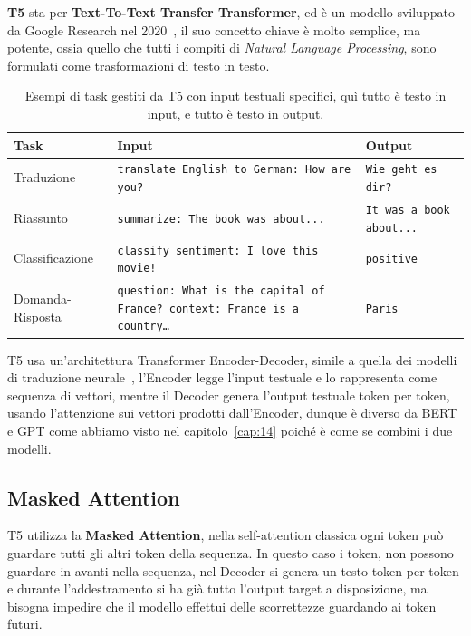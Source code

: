 \textbf{T5} sta per \textbf{Text-To-Text Transfer Transformer}, ed è un modello sviluppato da Google Research nel 2020~\cite{raffel2020t5}, il suo concetto chiave è molto semplice, ma potente, ossia quello che tutti i compiti di \textit{Natural Language Processing}, sono formulati come trasformazioni di testo in testo.

\begin{table}[htbp]
\centering
\begin{adjustbox}{width=0.9\textwidth}
\begin{tabular}{|l|p{7cm}|l|}
\hline
\textbf{Task} & \textbf{Input} & \textbf{Output} \\
\hline
Traduzione & \texttt{translate English to German: How are you?} & \texttt{Wie geht es dir?} \\
\hline
Riassunto & \texttt{summarize: The book was about...} & \texttt{It was a book about...} \\
\hline
Classificazione & \texttt{classify sentiment: I love this movie!} & \texttt{positive} \\
\hline
Domanda-Risposta & \texttt{question: What is the capital of France? context: France is a country\dots} & \texttt{Paris} \\
\hline
\end{tabular}
\end{adjustbox}
\caption{Esempi di task gestiti da T5 con input testuali specifici, quì tutto è testo in input, e tutto è testo in output.}
\end{table}
T5 usa un'architettura Transformer Encoder-Decoder, simile a quella dei modelli di traduzione neurale~\cite{vaswani2017attention}, l'Encoder legge l'input testuale e lo rappresenta come sequenza di vettori, mentre il Decoder genera l'output testuale token per token, usando l'attenzione sui vettori prodotti dall'Encoder, dunque è diverso da BERT e GPT come abbiamo visto nel capitolo~\ref{cap:14} poiché è come se combini i due modelli.

\subsection{Masked Attention}
T5 utilizza la \textbf{Masked Attention}, nella self-attention classica ogni token può guardare tutti gli altri token della sequenza. In questo caso i token, non possono guardare in avanti nella sequenza, nel Decoder si genera un testo token per token e durante l'addestramento si ha già tutto l'output target a disposizione, ma bisogna impedire che il modello effettui delle scorrettezze guardando ai token futuri.

